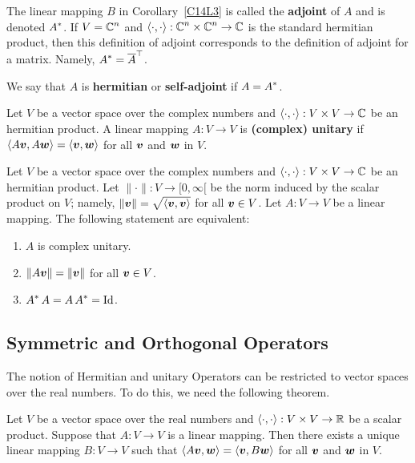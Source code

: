 \begin{defn}
The linear mapping $B$ in Corollary~\ref{C14L3} is called the
{\bfseries adjoint} of $A$ and is
denoted $\displaystyle A^\ast$.  If $\displaystyle V=\mathbb{C}^n$ and
$\displaystyle \left\langle{\cdot} , {\cdot}\right\rangle:\mathbb{C}^n \times \mathbb{C}^n \to \mathbb{C}$ is the standard
hermitian product, then this definition of adjoint
corresponds to the definition of adjoint for a matrix.
Namely, $\displaystyle A^\ast = \overline{A}^\top$.

We say that $A$ is
{\bfseries hermitian} or
{\bfseries self-adjoint} if
$\displaystyle A = A^\ast$.
\end{defn}

\begin{defn}
Let $V$ be a vector space over the complex numbers and
$\left\langle{\cdot} , {\cdot}\right\rangle:V \times V \rightarrow \mathbb{C}$ be an hermitian product.  A
linear mapping $A:V \rightarrow V$ is
{\bfseries (complex) unitary} if
$\left\langle{A\bm{v}} , {A\bm{w}}\right\rangle = \left\langle{\bm{v}} , {\bm{w}}\right\rangle$ for all $\bm{v}$ and
$\bm{w}$ in $V$.
\end{defn}

\begin{theorem}
Let $V$ be a vector space over the complex numbers and
$\left\langle{\cdot} , {\cdot}\right\rangle:V \times V \rightarrow \mathbb{C}$ be an hermitian product.  Let
$\|\cdot\|:V \rightarrow [0,\infty[$ be the norm induced by the scalar
product on $V$; namely, $\|\bm{v}\| = \sqrt{\left\langle{\bm{v}} , {\bm{v}}\right\rangle}$
for all $\bm{v} \in V$.  Let $A:V \rightarrow V$ be a linear mapping.
The following statement are equivalent:
\begin{enumerate}
\item $A$ is complex unitary.
\item $\| A\bm{v} \| =  \|\bm{v}\|$ for all $\bm{v} \in V$.
\item $\displaystyle A^\ast\,A = A \, A^{\ast} = \operatorname{Id}$.
\end{enumerate}
\end{theorem}

\subsection{Symmetric and Orthogonal Operators}

The notion of Hermitian and unitary Operators can be restricted to vector
spaces over the real numbers.  To do this, we need the following theorem.

\begin{theorem}
Let $V$ be a vector space over the real numbers and
$\left\langle{\cdot} , {\cdot}\right\rangle :V \times V \rightarrow \mathbb{R}$ be a scalar product.  Suppose
that $A: V \rightarrow V$ is a linear mapping.  Then there exists a
unique linear mapping $B:V \rightarrow V$ such that
$\left\langle{A\bm{v}} , {\bm{w}}\right\rangle = \left\langle{\bm{v}} , {B\bm{w}}\right\rangle$ for
all $\bm{v}$ and $\bm{w}$ in $V$.
\label{C14L4}
\end{theorem}

